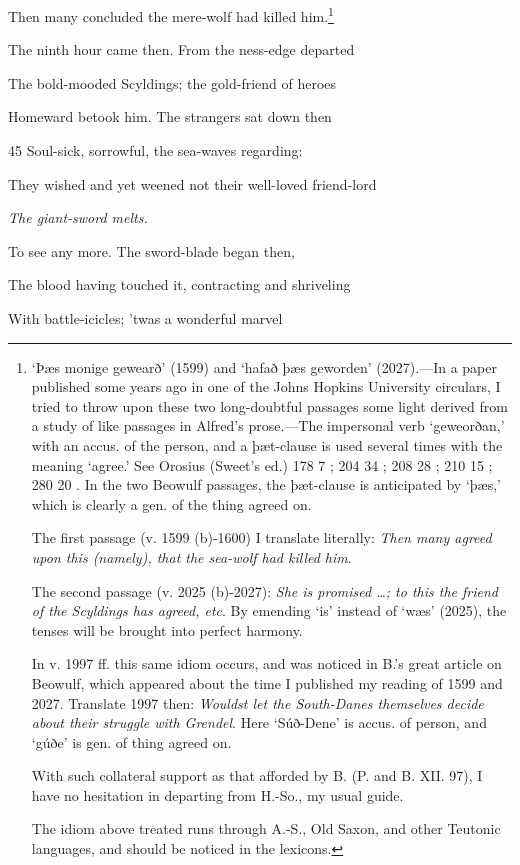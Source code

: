 Then many concluded the mere-wolf had killed him.\footnote{‘Þæs monige gewearð’ (1599) and ‘hafað þæs geworden’ (2027).—In a
paper published some years ago in one of the Johns Hopkins University
circulars, I tried to throw upon these two long-doubtful passages some light
derived from a study of like passages in Alfred’s prose.—The impersonal verb
‘geweorðan,’ with an accus. of the person, and a þæt-clause is used several
times with the meaning ‘agree.’ See Orosius (Sweet’s ed.) 178 7 ; 204 34 ;
208 28 ; 210 15 ; 280 20 . In the two Beowulf passages, the þæt-clause is anticipated
by ‘þæs,’ which is clearly a gen. of the thing agreed on.

The first passage (v. 1599 (b)-1600) I translate literally: \emph{Then many
agreed upon this (namely), that the sea-wolf had killed him}.

The second passage (v. 2025 (b)-2027): \emph{She is promised …; to this the
friend of the Scyldings has agreed, etc}. By emending ‘is’ instead of ‘wæs’
(2025), the tenses will be brought into perfect harmony.

In v. 1997 ff. this same idiom occurs, and was noticed in B.’s great
article on Beowulf, which appeared about the time I published my reading
of 1599 and 2027. Translate 1997 then: \emph{Wouldst let the South-Danes themselves
decide about their struggle with Grendel}. Here ‘Súð-Dene’ is accus.
of person, and ‘gúðe’ is gen. of thing agreed on.

With such collateral support as that afforded by B. (P. and B. XII. 97), I
have no hesitation in departing from H.-So., my usual guide.

The idiom above treated runs through A.-S., Old Saxon, and other Teutonic
languages, and should be noticed in the lexicons.}

The ninth hour came then. From the ness-edge departed

The bold-mooded Scyldings; the gold-friend of heroes

Homeward betook him. The strangers sat down then

45
Soul-sick, sorrowful, the sea-waves regarding:

They wished and yet weened not their well-loved friend-lord

\emph{The giant-sword
melts.}

To see any more. The sword-blade began then,

The blood having touched it, contracting and shriveling

With battle-icicles; ’twas a wonderful marvel

